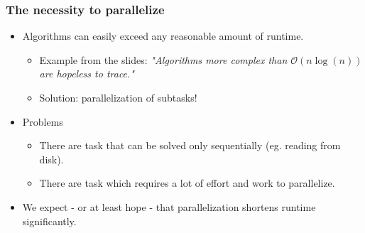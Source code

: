 \begin{frame}
\frametitle{The necessity to parallelize}

\begin{itemize}
	\item<1-> Algorithms can easily exceed any reasonable amount of runtime.
	\begin{itemize}
		\item<1-> Example from the slides: \textit{"Algorithms more complex than $\mathcal{O} \left( n \log \left( n \right) \right)$ are hopeless to trace."}
		\item<2-> Solution: parallelization of subtasks!
	\end{itemize}
	\item<3-> Problems
	\begin{itemize}
		\item<3-> There are task that can be solved only sequentially (eg. reading from disk).
		\item<3-> There are task which requires a lot of effort and work to parallelize.
	\end{itemize}
	\item<4-> We expect - or at least hope - that parallelization shortens runtime significantly.
\end{itemize}

\end{frame}